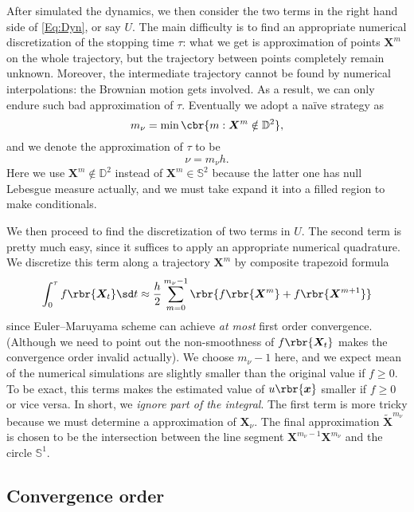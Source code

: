 \documentclass[english, nochinese]{pnote}
\begin{document}
After simulated the dynamics, we then consider the two terms in the right hand side of \eqref{Eq:Dyn}, or say $U$. The main difficulty is to find an appropriate numerical discretization of the stopping time $\tau$: what we get is approximation of points $\bm{X}^m$ on the whole trajectory, but the trajectory between points completely remain unknown. Moreover, the intermediate trajectory cannot be found by numerical interpolations: the Brownian motion gets involved. As a result, we can only endure such bad approximation of $\tau$. Eventually we adopt a na\"ive strategy as
\begin{equation}
m_{\nu} = \min \cbr{ m: \bm{X}^m \notin \mathbb{D}^2 },
\end{equation}
and we denote the approximation of $\tau$ to be
\begin{equation}
\nu = m_{\nu} h.
\end{equation}
Here we use $ \bm{X}^m \notin \mathbb{D}^2 $ instead of $ \bm{X}^m \in \mathbb{S}^2 $ because the latter one has null Lebesgue measure actually, and we must take expand it into a filled region to make conditionals.

We then proceed to find the discretization of two terms in $U$. The second term is pretty much easy, since it suffices to apply an appropriate numerical quadrature. We discretize this term along a trajectory $\bm{X}^m$ by composite trapezoid formula
\begin{equation} \label{Eq:Trap}
\int_0^{\tau} f \rbr{\bm{X}_t} \sd t \approx \frac{h}{2} \sum_{ m = 0 }^{ m_{\nu} - 1 } \rbr{ f \rbr{\bm{X}^m} + f \rbr{\bm{X}^{ m + 1 }} }
\end{equation}
since Euler--Maruyama scheme can achieve \emph{at most} first order convergence. (Although we need to point out the non-smoothness of $ f \rbr{\bm{X}_t} $ makes the convergence order invalid actually). We choose $ m_{\nu} - 1 $ here, and we expect mean of the numerical simulations are slightly smaller than the original value if $ f \ge 0 $. To be exact, this terms makes the estimated value of $ u \rbr{\bm{x}} $ smaller if $ f \ge 0 $ or vice versa. In short, we \emph{ignore part of the integral}. The first term is more tricky because we must determine a approximation of $\bm{X}_{\nu}$. The final approximation $\tilde{\bm{X}}^{m_{\nu}}$ is chosen to be the intersection between the line segment $ \bm{X}^{ m_{\nu} - 1 } \bm{X}^{m_{\nu}} $ and the circle $\mathbb{S}^1$.

\subsection{Convergence order}
\end{document}
